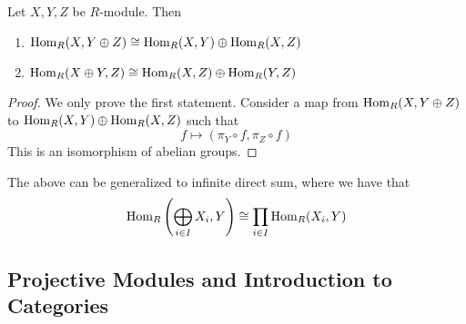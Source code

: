 \begin{pro}
    Let $X, Y, Z$ be $R$-module. Then
    \begin{enumerate}
        \item $\operatorname{Hom}_R(X, Y\oplus Z)\cong \operatorname{Hom}_R(X,Y)\oplus \operatorname{Hom}_R(X,Z)$
        \item $\operatorname{Hom}_R(X\oplus Y, Z)\cong \operatorname{Hom}_R(X,Z)\oplus \operatorname{Hom}_R(Y,Z)$
    \end{enumerate}
\end{pro}
\begin{proof}
    We only prove the first statement. Consider a map from $\operatorname{Hom}_R(X, Y\oplus Z)$ to $\operatorname{Hom}_R(X,Y)\oplus \operatorname{Hom}_R(X,Z)$ such that 
    \[f\mapsto (\pi_Y\circ f, \pi_Z\circ f)\]
    This is an isomorphism of abelian groups.
\end{proof}

\begin{re}
    The above can be generalized to infinite direct sum, where we have that
    \[\operatorname{Hom}_R\left(\bigoplus_{i\in I}X_i, Y\right)\cong \prod_{i\in I} \operatorname{Hom}_R(X_i, Y)\]
\end{re}

\newpage


\subsection{Projective Modules and Introduction to Categories}

